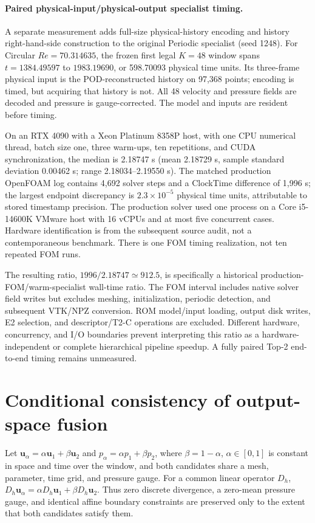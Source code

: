 \documentclass{article}
\providecommand{\DIFaddtex}[1]{{\protect\color{blue} \sf #1}} %
\providecommand{\DIFadd}[1]{\texorpdfstring{\DIFaddtex{#1}}{#1}} %
\begin{document}
\paragraph{\DIFadd{Paired physical-input/physical-output specialist timing.}}
\DIFadd{A separate measurement adds full-size physical-history encoding and
history right-hand-side construction to the original Periodic specialist
(seed 1248). For Circular $Re=70.314635$, the frozen first legal $K=48$
window spans $t=1384.49597$ to $1983.19690$, or 598.70093 physical time
units. Its three-frame physical input is the POD-reconstructed history
on 97,368 points; encoding is timed, but acquiring that history is not.
All 48 velocity and pressure fields are decoded and pressure is
gauge-corrected. The model and inputs are resident before timing.
}

\DIFadd{On an RTX 4090 with a Xeon Platinum 8358P host, with one CPU numerical
thread, batch size one, three warm-ups, ten repetitions, and CUDA
synchronization, the median is 2.18747 s (mean 2.18729 s, sample standard
deviation 0.00462 s; range 2.18034--2.19550 s). The matched production
OpenFOAM log contains 4,692 solver steps and a ClockTime difference of
1,996 s; the largest endpoint discrepancy is $2.3\times10^{-5}$ physical
time units, attributable to stored timestamp precision. The production
solver used one process on a Core i5-14600K VMware host with 16 vCPUs and
at most five concurrent cases. Hardware identification is from the
subsequent source audit, not a contemporaneous benchmark. There is one
FOM timing realization, not ten repeated FOM runs.
}

\DIFadd{The resulting ratio, $1996/2.18747\simeq912.5$, is specifically a historical
production-FOM/warm-specialist wall-time ratio. The FOM interval includes
native solver field writes but excludes meshing, initialization, periodic
detection, and subsequent VTK/NPZ conversion. ROM model/input loading,
output disk writes, E2 selection, and descriptor/T2-C operations are
excluded. Different hardware, concurrency, and I/O boundaries prevent
interpreting this ratio as a hardware-independent or complete hierarchical
pipeline speedup. A fully paired Top-2 end-to-end timing remains unmeasured.
}

\section{\DIFadd{Conditional consistency of output-space fusion}}
\label{app:fusion_consistency}
\DIFadd{Let $\bm u_\alpha=\alpha\bm u_1+\beta\bm u_2$ and $p_\alpha=\alpha p_1+\beta p_2$, where $\beta=1-\alpha$, $\alpha\in[0,1]$ is constant in space and time over the window, and both candidates share a mesh, parameter, time grid, and pressure gauge. For a common linear operator $D_h$, $D_h\bm u_\alpha=\alpha D_h\bm u_1+\beta D_h\bm u_2$. Thus zero discrete divergence, a zero-mean pressure gauge, and identical affine boundary constraints are preserved only to the extent that both candidates satisfy them.
}
\end{document}
